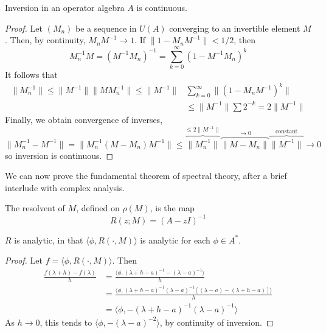 \begin{lemma}
    Inversion in an operator algebra $A$ is continuous.
\end{lemma}
\begin{proof}
    Let $(M_n)$ be a sequence in $U(A)$ converging to an invertible element $M$. Then, by continuity, $M_nM^{-1} \to 1$. If $\| 1 - M_n M^{-1} \| < 1/2$, then
    \[ M_n^{-1} M = (M^{-1}M_n)^{-1} = \sum_{k = 0}^\infty (1 - M^{-1}M_n)^k \]
    It follows that
    \begin{align*}
        \| M_n^{-1} \| \leq \| M^{-1} \| \| M M_n^{-1} \| \leq \| M^{-1} \| &\sum_{k = 0}^\infty \| (1 - M_nM^{-1})^k \|\\
        &\leq \| M^{-1} \| \sum 2^{-k} = 2 \| M^{-1} \|
    \end{align*}
    Finally, we obtain convergence of inverses,
    \[ \| M_n^{-1} - M^{-1} \| = \| M_n^{-1} (M - M_n) M^{-1} \| \leq \overbrace{\| M_n^{-1} \|}^{\leq 2 \| M^{-1} \|} \overbrace{\| M - M_n \|}^{\to 0} \overbrace{\| M^{-1} \|}^{\text{constant}} \to 0 \]
    so inversion is continuous.
\end{proof}

We can now prove the fundamental theorem of spectral theory, after a brief interlude with complex analysis.

\begin{definition}
    The resolvent of $M$, defined on $\rho(M)$, is the map
    \[ R(z; M) = (A - zI)^{-1} \]
\end{definition}

\begin{lemma}
    $R$ is analytic, in that $\langle \phi, R(\cdot, M) \rangle$ is analytic for each $\phi \in A^*$.
\end{lemma}
\begin{proof}
    Let $f = \langle \phi, R(\cdot, M) \rangle$. Then
    \begin{align*}
        \frac{f(\lambda + h) - f(\lambda)}{h} &= \frac{\langle \phi, (\lambda + h - a)^{-1} - (\lambda - a)^{-1} \rangle}{h}\\
        &= \frac{\langle \phi, (\lambda + h - a)^{-1} (\lambda - a)^{-1} [(\lambda - a) - (\lambda + h - a)] \rangle}{h}\\
        &= \langle \phi, -(\lambda + h - a)^{-1} (\lambda - a)^{-1} \rangle
    \end{align*}
    As $h \to 0$, this tends to $\langle \phi, - (\lambda - a)^{-2} \rangle$, by continuity of inversion.
\end{proof}

